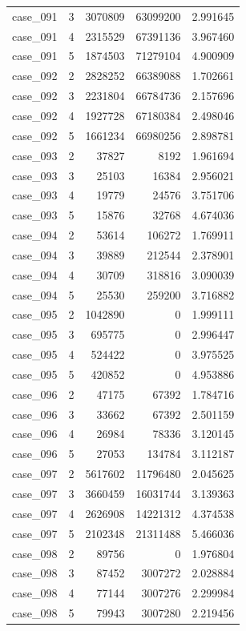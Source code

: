 \begin{longtable}{lrrrr}
case\_091 & 3 & 3070809 & 63099200 & 2.991645 \\
case\_091 & 4 & 2315529 & 67391136 & 3.967460 \\
case\_091 & 5 & 1874503 & 71279104 & 4.900909 \\
case\_092 & 2 & 2828252 & 66389088 & 1.702661 \\
case\_092 & 3 & 2231804 & 66784736 & 2.157696 \\
case\_092 & 4 & 1927728 & 67180384 & 2.498046 \\
case\_092 & 5 & 1661234 & 66980256 & 2.898781 \\
case\_093 & 2 & 37827 & 8192 & 1.961694 \\
case\_093 & 3 & 25103 & 16384 & 2.956021 \\
case\_093 & 4 & 19779 & 24576 & 3.751706 \\
case\_093 & 5 & 15876 & 32768 & 4.674036 \\
case\_094 & 2 & 53614 & 106272 & 1.769911 \\
case\_094 & 3 & 39889 & 212544 & 2.378901 \\
case\_094 & 4 & 30709 & 318816 & 3.090039 \\
case\_094 & 5 & 25530 & 259200 & 3.716882 \\
case\_095 & 2 & 1042890 & 0 & 1.999111 \\
case\_095 & 3 & 695775 & 0 & 2.996447 \\
case\_095 & 4 & 524422 & 0 & 3.975525 \\
case\_095 & 5 & 420852 & 0 & 4.953886 \\
case\_096 & 2 & 47175 & 67392 & 1.784716 \\
case\_096 & 3 & 33662 & 67392 & 2.501159 \\
case\_096 & 4 & 26984 & 78336 & 3.120145 \\
case\_096 & 5 & 27053 & 134784 & 3.112187 \\
case\_097 & 2 & 5617602 & 11796480 & 2.045625 \\
case\_097 & 3 & 3660459 & 16031744 & 3.139363 \\
case\_097 & 4 & 2626908 & 14221312 & 4.374538 \\
case\_097 & 5 & 2102348 & 21311488 & 5.466036 \\
case\_098 & 2 & 89756 & 0 & 1.976804 \\
case\_098 & 3 & 87452 & 3007272 & 2.028884 \\
case\_098 & 4 & 77144 & 3007276 & 2.299984 \\
case\_098 & 5 & 79943 & 3007280 & 2.219456 \\

\end{longtable}
